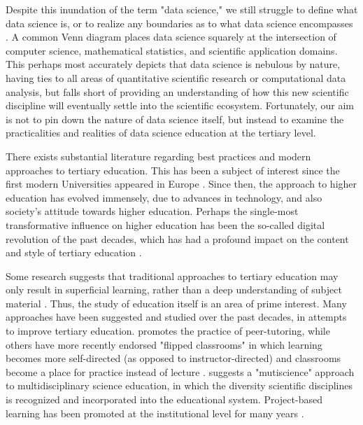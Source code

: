 \documentclass{sig-alternate}
\begin{document}
Despite this inundation of the term "data science," we still struggle to define what data science is, or to realize any boundaries as to what data science encompasses \cite{Hayashi1998, Loukides2011, Provost2013}. A common Venn diagram places data science squarely at the intersection of computer science, mathematical statistics, and scientific application domains.  This perhaps most accurately depicts that data science is nebulous by nature, having ties to all areas of quantitative scientific research or computational data analysis, but falls short of providing an understanding of how this new scientific discipline will eventually settle into the scientific ecosystem.  Fortunately, our aim is not to pin down the nature of data science itself, but instead to examine the practicalities and realities of data science education at the tertiary level.

There exists substantial literature regarding best practices and modern approaches to tertiary education. This has been a subject of interest since the first modern Universities appeared in Europe \cite{Rudy1984, Pedersen1997}.  Since then, the approach to higher education has evolved immensely, due to advances in technology, and also society's attitude towards higher education.  Perhaps the single-most transformative influence on higher education has been the so-called digital revolution of the past decades, which has had a profound impact on the content and style of tertiary education \cite{Roberts1994, Ely1995, Baker1997, Wood2005, Baek2008}.

Some research suggests that traditional approaches to tertiary education may only result in superficial learning, rather than a deep understanding of subject material \cite{Entwistle1992}.  Thus, the study of education itself is an area of prime interest.  Many approaches have been suggested and studied over the past decades, in attempts to improve tertiary education.  \cite{Topping1996} promotes the practice of peer-tutoring, while others have more recently endorsed "flipped classrooms" in which learning becomes more self-directed (as opposed to instructor-directed) and classrooms become a place for practice instead of lecture \cite{Horn2013, Herreid2013}.  \cite{Ogawa1995} suggests a "mutiscience" approach to multidisciplinary science education, in which the diversity scientific disciplines is recognized and incorporated into the educational system.  Project-based learning has been promoted at the institutional level for many years \cite{Krajcik2006, Thomas2000}.
\end{document}
